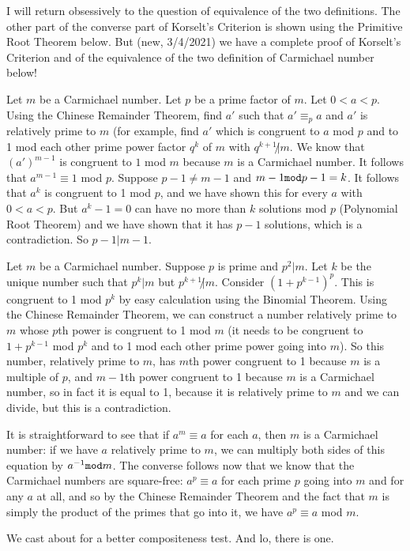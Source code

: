 \documentclass[12pt]{article}
\begin{document}
I will return obsessively to the question of equivalence of the two definitions.   The other part of the converse part of Korselt's Criterion is shown using the Primitive Root Theorem below.  But (new, 3/4/2021) we have a complete proof of Korselt's Criterion and of the equivalence of the two definition of Carmichael number below!

Let $m$ be a Carmichael number.  Let $p$ be a prime factor of $m$.  Let $0<a<p$.  Using the Chinese Remainder Theorem, find $a'$ such that $a' \equiv_p a$ and $a'$ is relatively prime to $m$ (for example, find $a'$ which is congruent to $a$ mod $p$ and to 1 mod each other prime power factor $q^k$ of $m$ with $q^{k+1} \not|m$.  We know that $(a')^{m-1}$ is congruent to $1$ mod $m$ because $m$ is a Carmichael number.  It follows that $a^{m-1} \equiv 1$ mod $p$.  Suppose $p-1 \neq m-1$ and $m-1 {\tt mod} p-1 = k$.  It follows
that $a^k$ is congruent to 1 mod $p$, and we have shown this for every $a$ with $0<a<p$.  But $a^k-1 = 0$ can have no more than $k$ solutions mod $p$ (Polynomial Root Theorem) and we have shown that it has $p-1$ solutions, which is a contradiction.
So $p-1 | m-1$.

Let $m$ be a Carmichael number.  Suppose $p$ is prime and $p^2|m$.  Let $k$ be the unique number such that $p^k|m$ but $p^{k+1}\not|m$.  Consider $(1+p^{k-1})^p$.  This is congruent to 1 mod $p^k$ by easy calculation using the Binomial Theorem.  Using the Chinese Remainder Theorem, we can construct a number relatively prime to $m$ whose $p$th power is congruent to 1 mod $m$ (it needs to be congruent to $1+p^{k-1}$ mod $p^k$ and to 1 mod each other prime power going into $m$).  So this number, relatively prime to $m$, has $m$th power congruent to 1 because $m$ is a multiple of $p$, and $m-1$th power congruent to 1 because $m$ is a Carmichael number, so in fact it is equal to 1, because it is relatively prime to $m$ and we can divide, but this is a contradiction.

It is straightforward to see that if $a^m \equiv a$ for each $a$, then $m$ is a Carmichael number:  if we have $a$ relatively prime to $m$, we can multiply both sides of this equation by $a^{-1}{\tt mod}m$.  The converse follows
now that we know that the Carmichael numbers are square-free:  $a^p \equiv a$ for each prime $p$ going into $m$ and for any $a$ at all, and so by the Chinese Remainder Theorem and the fact that $m$ is simply the product of the primes
that go into it, we have $a^p \equiv a$ mod $m$.

We cast about for a better compositeness test.  And lo, there is one.
\end{document}

